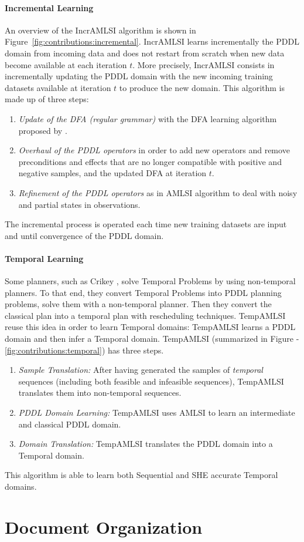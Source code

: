 \paragraph{Incremental Learning}
An overview of the IncrAMLSI algorithm \cite{incr} is shown in Figure~\ref{fig:contributions:incremental}. IncrAMLSI learns incrementally the PDDL domain from incoming data and does not restart from scratch when new data become available at each iteration $t$. More precisely, IncrAMLSI consists in incrementally updating the PDDL domain with the new incoming training datasets available at iteration $t$ to produce the new domain. This algorithm is made up of three steps:
    \begin{enumerate}
        \item {\em Update of the DFA (regular grammar)} with the DFA learning algorithm proposed by \cite{amlsi_ictai}.
        \item {\em Overhaul of the PDDL operators} in order to add new operators and remove preconditions and effects that are no longer compatible with positive and negative samples, and the updated DFA at iteration $t$.
        \item {\em Refinement of the PDDL operators} as in AMLSI algorithm to deal with noisy and partial states in observations.
    \end{enumerate}
The incremental process is operated each time new training datasets are input and until convergence of the PDDL domain.

\paragraph{Temporal Learning}
Some planners, such as Crikey \cite{crikey}, solve {\sf Temporal }Problems by using non-temporal planners. To that end, they convert {\sf Temporal }Problems into {\sf PDDL} planning problems, solve them with a non-temporal planner. Then they convert the classical plan into a temporal plan with rescheduling techniques. TempAMLSI \cite{temp} reuse this idea in order to learn {\sf Temporal} domains: TempAMLSI learns a {\sf PDDL} domain and then infer a {\sf Temporal } domain. TempAMLSI (summarized in Figure \-- \ref{fig:contributions:temporal}) has three steps.
\begin{enumerate}
    \item {\em Sample Translation:} After having generated the samples of {\it temporal} sequences (including both feasible and infeasible sequences), TempAMLSI translates them into non-temporal sequences.
    \item {\em PDDL Domain Learning:} TempAMLSI uses AMLSI to learn an intermediate and classical {\sf PDDL} domain.
    \item {\em Domain Translation:} TempAMLSI translates the PDDL domain into a {\sf Temporal} domain.
\end{enumerate}
This algorithm is able to learn both Sequential and SHE accurate {\sf Temporal} domains.


\section{Document Organization}
